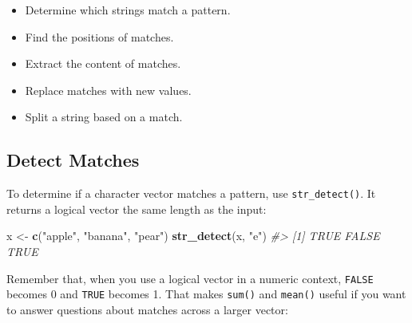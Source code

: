 \documentclass[]{book}
\newenvironment{Shaded}{\begin{snugshade}}{\end{snugshade}}
\newcommand{\KeywordTok}[1]{\textcolor[rgb]{0.13,0.29,0.53}{\textbf{#1}}}
\newcommand{\DecValTok}[1]{\textcolor[rgb]{0.00,0.00,0.81}{#1}}
\newcommand{\StringTok}[1]{\textcolor[rgb]{0.31,0.60,0.02}{#1}}
\newcommand{\CommentTok}[1]{\textcolor[rgb]{0.56,0.35,0.01}{\textit{#1}}}
\newcommand{\OperatorTok}[1]{\textcolor[rgb]{0.81,0.36,0.00}{\textbf{#1}}}
\newcommand{\NormalTok}[1]{#1}
\providecommand{\tightlist}{%
  \setlength{\itemsep}{0pt}\setlength{\parskip}{0pt}}
\begin{document}
\begin{itemize}
\tightlist
\item
  Determine which strings match a pattern.
\item
  Find the positions of matches.
\item
  Extract the content of matches.
\item
  Replace matches with new values.
\item
  Split a string based on a match.
\end{itemize}

\subsection{Detect Matches}\label{detect-matches}

To determine if a character vector matches a pattern, use
\texttt{str\_detect()}. It returns a logical vector the same length as
the input:

\begin{Shaded}
\begin{Highlighting}[]
\NormalTok{x <-}\StringTok{ }\KeywordTok{c}\NormalTok{(}\StringTok{"apple"}\NormalTok{, }\StringTok{"banana"}\NormalTok{, }\StringTok{"pear"}\NormalTok{)}
\KeywordTok{str_detect}\NormalTok{(x, }\StringTok{"e"}\NormalTok{)}
\CommentTok{#> [1]  TRUE FALSE  TRUE}
\end{Highlighting}
\end{Shaded}

Remember that, when you use a logical vector in a numeric context,
\texttt{FALSE} becomes 0 and \texttt{TRUE} becomes 1. That makes
\texttt{sum()} and \texttt{mean()} useful if you want to answer
questions about matches across a larger vector:

\begin{Shaded}
\end{Shaded}
\end{document}
